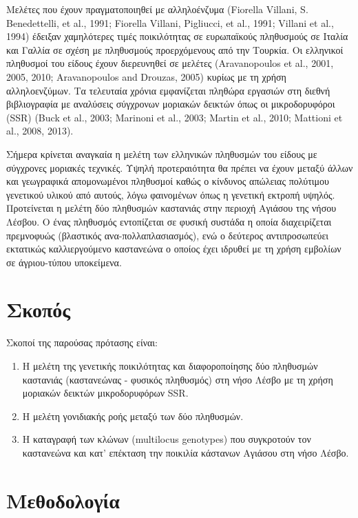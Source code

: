\documentclass[12pt,a4paper,]{report}
\begin{document}
Μελέτες που έχουν πραγματοποιηθεί με αλληλοένζυμα (Fiorella Villani, S.
Benedettelli, et al., 1991; Fiorella Villani, Pigliucci, et al., 1991;
Villani et al., 1994) έδειξαν χαμηλότερες τιμές ποικιλότητας σε
ευρωπαϊκούς πληθυσμούς σε Ιταλία και Γαλλία σε σχέση με πληθυσμούς
προερχόμενους από την Τουρκία. Οι ελληνικοί πληθυσμοί του είδους έχουν
διερευνηθεί σε μελέτες (Aravanopoulos et al., 2001, 2005, 2010;
Aravanopoulos and Drouzas, 2005) κυρίως με τη χρήση αλληλοενζύμων. Τα
τελευταία χρόνια εμφανίζεται πληθώρα εργασιών στη διεθνή βιβλιογραφία με
αναλύσεις σύγχρονων μοριακών δεικτών όπως οι μικροδορυφόροι (SSR) (Buck
et al., 2003; Marinoni et al., 2003; Martin et al., 2010; Mattioni et
al., 2008, 2013).

Σήμερα κρίνεται αναγκαία η μελέτη των ελληνικών πληθυσμών του είδους με
σύγχρονες μοριακές τεχνικές. Υψηλή προτεραιότητα θα πρέπει να έχουν
μεταξύ άλλων και γεωγραφικά απομονωμένοι πληθυσμοί καθώς ο κίνδυνος
απώλειας πολύτιμου γενετικού υλικού από αυτούς, λόγω φαινομένων όπως η
γενετική εκτροπή υψηλός. Προτείνεται η μελέτη δύο πληθυσμών καστανιάς
στην περιοχή Αγιάσου της νήσου Λέσβου. Ο ένας πληθυσμός εντοπίζεται σε
φυσική συστάδα η οποία διαχειρίζεται πρεμνοφυώς (βλαστικός
ανα-πολλαπλασιασμός), ενώ ο δεύτερος αντιπροσωπεύει εκτατικώς
καλλιεργούμενο καστανεώνα ο οποίος έχει ιδρυθεί με τη χρήση εμβολίων σε
άγριου-τύπου υποκείμενα.

\section{Σκοπός}

Σκοποί της παρούσας πρότασης είναι:

\begin{enumerate}
\def\labelenumi{\arabic{enumi}.}
\item
  Η μελέτη της γενετικής ποικιλότητας και διαφοροποίησης δύο πληθυσμών
  καστανιάς (καστανεώνας - φυσικός πληθυσμός) στη νήσο Λέσβο με τη χρήση
  μοριακών δεικτών μικροδορυφόρων SSR.
\item
  Η μελέτη γονιδιακής ροής μεταξύ των δύο πληθυσμών.
\item
  Η καταγραφή των κλώνων (multilocus genotypes) που συγκροτούν τον
  καστανεώνα και κατ' επέκταση την ποικιλία κάστανων Αγιάσου στη νήσο
  Λέσβο.
\end{enumerate}

\section{Μεθοδολογία}
\end{document}
